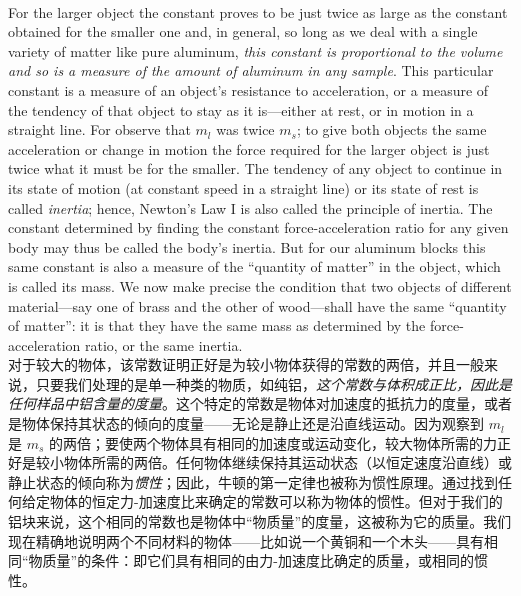 \documentclass{article}
\begin{document}
\\
For the larger object the constant proves to be just twice as large as the constant obtained for the smaller one and, in general, so long as we deal with a single variety of matter like pure aluminum, \textit{this constant is proportional to the volume and so is a measure of the amount of aluminum in any sample}. This particular constant is a measure of an object's resistance to acceleration, or a measure of the tendency of that object to stay as it is—either at rest, or in motion in a straight line. For observe that \( m_l \) was twice \( m_s \); to give both objects the same acceleration or change in motion the force required for the larger object is just twice what it must be for the smaller. The tendency of any object to continue in its state of motion (at constant speed in a straight line) or its state of rest is called \textit{inertia}; hence, Newton's Law I is also called the principle of inertia. The constant determined by finding the constant force-acceleration ratio for any given body may thus be called the body's inertia. But for our aluminum blocks this same constant is also a measure of the ``quantity of matter'' in the object, which is called its mass. We now make precise the condition that two objects of different material—say one of brass and the other of wood—shall have the same ``quantity of matter'': it is that they have the same mass as determined by the force-acceleration ratio, or the same inertia.\\
对于较大的物体，该常数证明正好是为较小物体获得的常数的两倍，并且一般来说，只要我们处理的是单一种类的物质，如纯铝，\textit{这个常数与体积成正比，因此是任何样品中铝含量的度量}。这个特定的常数是物体对加速度的抵抗力的度量，或者是物体保持其状态的倾向的度量——无论是静止还是沿直线运动。因为观察到 \( m_l \) 是 \( m_s \) 的两倍；要使两个物体具有相同的加速度或运动变化，较大物体所需的力正好是较小物体所需的两倍。任何物体继续保持其运动状态（以恒定速度沿直线）或静止状态的倾向称为\textit{惯性}；因此，牛顿的第一定律也被称为惯性原理。通过找到任何给定物体的恒定力-加速度比来确定的常数可以称为物体的惯性。但对于我们的铝块来说，这个相同的常数也是物体中“物质量”的度量，这被称为它的质量。我们现在精确地说明两个不同材料的物体——比如说一个黄铜和一个木头——具有相同“物质量”的条件：即它们具有相同的由力-加速度比确定的质量，或相同的惯性。\\
\end{document}
